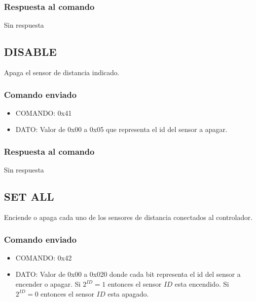 \documentclass[a4paper,11pt]{article}
\begin{document}
\subsubsection*{Respuesta al comando}
\label{enable_d_comando_respuesta}

Sin respuesta

\subsection{DISABLE}
\label{disable}

Apaga el sensor de distancia indicado.

\subsubsection*{Comando enviado}
\label{disable_d_comando_enviado}

\begin{itemize}
	\item{COMANDO:} 0x41
	\item{DATO:} Valor de 0x00 a 0x05 que representa el id del sensor a apagar.
\end{itemize}

\subsubsection*{Respuesta al comando}
\label{disable_d_comando_respuesta}

Sin respuesta

\subsection{SET ALL}
\label{enable}

Enciende o apaga cada uno de los sensores de distancia conectados al controlador.

\subsubsection*{Comando enviado}
\label{set_all_d_comando_enviado}

\begin{itemize}
	\item{COMANDO:} 0x42
	\item{DATO:} Valor de 0x00 a 0x020 donde cada bit representa el id del sensor a encender o apagar.
	Si $2^{ID} = 1$ entonces el sensor $ID$ esta encendido.
	Si $2^{ID} = 0$ entonces el sensor $ID$ esta apagado.
\end{itemize}
\end{document}
